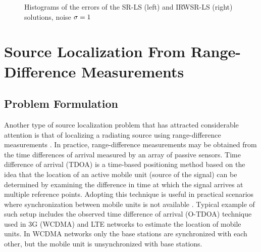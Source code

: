 \begin{figure}%
\centering
\caption{Histograms of the errors of the SR-LS (left) and IRWSR-LS (right) solutions, noise $\protect\sigma = 1$}
\label{fig:Noise00IRW}
\end{figure}

\newpage

\section{Source Localization From Range-Difference Measurements}%
\subsection{Problem Formulation} %

Another type of source localization problem that has attracted considerable attention is that of localizing a radiating source using range-difference measurements \cite{ StLi, BeckStLi}. In practice, range-difference measurements may be obtained from the time differences of arrival measured by an array of passive sensors. Time difference of arrival (TDOA) is a time-based positioning method based on the idea that the location of an active mobile unit (source of the signal)  can be determined by examining the difference in time at which the signal arrives at multiple reference points. 
Adopting this technique is useful in practical scenarios where synchronization between mobile units is not available \cite{GeoLoc}. Typical example of such setup includes the observed time difference of arrival (O-TDOA) technique used in 3G (WCDMA) and LTE networks to estimate the location of mobile units. In WCDMA networks only the base stations are synchronized with each other, but the mobile unit is unsynchronized with base stations. 

